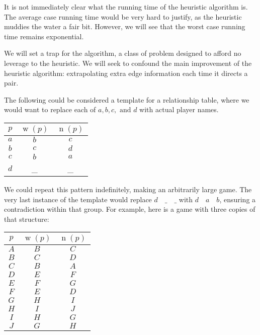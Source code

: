 \documentclass[12pt]{article}
\DeclareMathOperator{\w}{w}
\DeclareMathOperator{\n}{n}
\begin{document}
    It is not immediately clear what the running time of the heuristic algorithm is. The average case running time would be very hard to justify, as the heuristic muddies the water a fair bit. However, we will see that the worst case running time remains exponential.

    We will set a trap for the algorithm, a class of problem designed to afford no leverage to the heuristic. We will seek to confound the main improvement of the heuristic algorithm: extrapolating extra edge information each time it directs a pair. 

    The following could be considered a template for a relationship table, where we would want to replace each of $a, b, c, \text{ and }d$ with actual player names.

    \begin{center}
        \begin{tabular}{c | c | c}
            $p$ & $\w(p)$ & $\n(p)$\\
            \hline
            $a$ & $b$ & $c$\\
            $b$ & $c$ & $d$\\
            $c$ & $b$ & $a$\\
            $d$ & \_ & \_
        \end{tabular}
    \end{center}

    We could repeat this pattern indefinitely, making an arbitrarily large game. The very last instance of the template would replace $d \quad \_ \quad \_$ with $d \quad a \quad b$, ensuring a contradiction within that group. For example, here is a game with three copies of that structure:

    \begin{center}
        \begin{tabular}{c | c | c}
            $p$ & $\w(p)$ & $\n(p)$\\
            \hline
            $A$ & $B$ & $C$\\
            $B$ & $C$ & $D$\\
            $C$ & $B$ & $A$\\
            \hline
            $D$ & $E$ & $F$\\
            $E$ & $F$ & $G$\\
            $F$ & $E$ & $D$\\
            \hline
            $G$ & $H$ & $I$\\
            $H$ & $I$ & $J$\\
            $I$ & $H$ & $G$\\
            $J$ & $G$ & $H$
        \end{tabular}
    \end{center}
\end{document}
